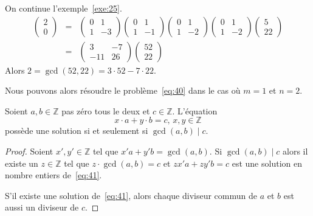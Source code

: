 \begin{example}
  \label{exe:26}
  On continue l'exemple~\ref{exe:25}.
  \begin{eqnarray*} 
    \begin{pmatrix}
      2 \\ 0
    \end{pmatrix} & = & 
    \begin{pmatrix}
      0 &1 \\
      1 & -3
    \end{pmatrix}
    \begin{pmatrix}
      0 &1 \\
      1 & -1
    \end{pmatrix}
    \begin{pmatrix}
      0 &1 \\
      1 & -2
    \end{pmatrix}
    \begin{pmatrix}
      0 &1 \\
      1 & -2
    \end{pmatrix}
    \begin{pmatrix}
     5 \\ 22
    \end{pmatrix} \\
   &  = & 
  \begin{pmatrix}
    3 & -7 \\
    -11 & 26 
  \end{pmatrix}
  \begin{pmatrix}
    52 \\22
  \end{pmatrix}
  \end{eqnarray*}
  Alors $2 = \gcd(52,22) = 3 ⋅52 -7 ⋅22$. 
\end{example}

Nous pouvons alors résoudre le problème~\eqref{eq:40} dans le cas où $m=1$ et $n=2$.

\begin{theorem}
  \label{thr:49}
  Soient $a,b ∈ℤ$ pas zéro tous le deux et $c ∈ℤ$. L'équation
  \begin{equation}
    \label{eq:41}
    x ⋅a + y ⋅b = c, \, x,y ∈ℤ
  \end{equation}
  possède une solution si et seulement si $\gcd(a,b) \mid c$. 
\end{theorem}
\begin{proof}
  Soient $x',y' ∈ℤ$ tel que $x' a + y'b = \gcd(a,b)$. Si $\gcd(a,b) \mid c$ alors il existe un $z ∈ℤ$ tel que $z ⋅\gcd(a,b) = c$ et $z x' a + z y'b = c$ est une solution en nombre entiers de~\eqref{eq:41}.

  S'il existe une solution de~\eqref{eq:41}, alors chaque diviseur commun de $a$ et $b$ est aussi un diviseur de $c$. 
\end{proof}

